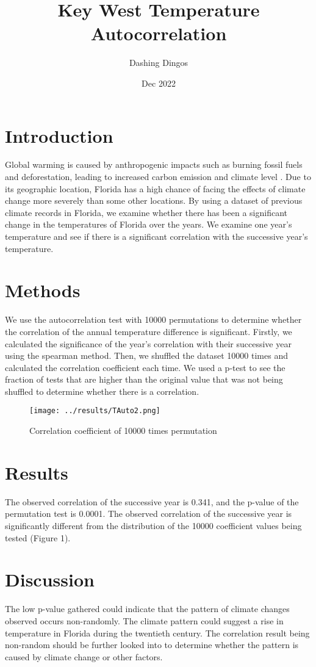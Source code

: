 \documentclass{article}
\title{Key West Temperature Autocorrelation}
\author{Dashing Dingos}
\date{Dec 2022}
\begin{document}
\section{Introduction}
Global warming is caused by anthropogenic impacts such as burning fossil fuels and deforestation, leading to increased carbon emission and climate level \cite{houghton2005global}.
Due to its geographic location, Florida has a high chance of facing the effects of climate change more severely than some other locations.
By using a dataset of previous climate records in Florida, we examine whether there has been a significant change in the temperatures of Florida over the years.
We examine one year's temperature and see if there is a significant correlation with the successive year's temperature.


\section{Methods}
We use the autocorrelation test with 10000 permutations to determine whether the correlation of the annual temperature difference is significant.
Firstly, we calculated the significance of the year's correlation with their successive year using the spearman method.
Then, we shuffled the dataset 10000 times and calculated the correlation coefficient each time.
We used a p-test to see the fraction of tests that are higher than the original value that was not being shuffled to determine whether there is a correlation.

\begin{figure}[H]
    \begin{center}
\centering
\texttt{[image: ../results/TAuto2.png]}
\caption{Correlation coefficient of 10000 times permutation}
\end{center}
\end{figure}

\section{Results}
The observed correlation of the successive year is 0.341, and the p-value of the permutation test is 0.0001. 
The observed correlation of the successive year is significantly different from the distribution of the 10000 coefficient values being tested (Figure 1).


\section{Discussion}
The low p-value gathered could indicate that the pattern of climate changes observed occurs non-randomly.
The climate pattern could suggest a rise in temperature in Florida during the twentieth century.
The correlation result being non-random should be further looked into to determine whether the pattern is caused by climate change or other factors.


    
\end{document}
